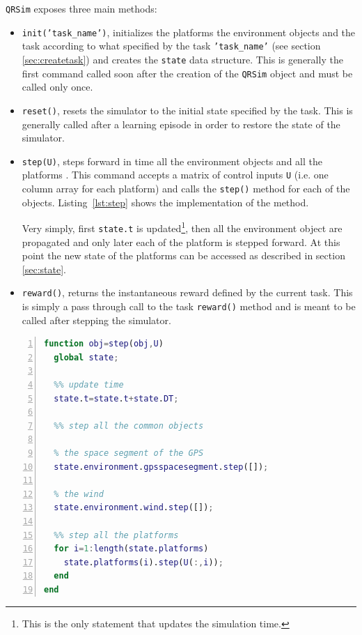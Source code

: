 \documentclass[a4paper,11pt]{report}
\newcommand{\sname}{QRSim\xspace}
\newcommand{\snamettt}{\texttt{QRSim}\xspace}
\begin{document}
\snamettt exposes three main methods:
\begin{itemize}
 \item \texttt{init('task\_name')}, initializes the platforms the environment objects and the task according to what specified by the task \texttt{'task\_name'} (see section \ref{sec:createtask}) and creates the \texttt{state} data structure. This is generally the first command called soon after the creation of the \snamettt object and must be called only once.
 \item \texttt{reset()}, resets the simulator to the initial state specified by the task. This is generally called after a learning episode in order to restore the state of the simulator. 
 \item \texttt{step(U)}, steps forward in time all the environment objects and all the platforms . This command accepts a matrix of control inputs \texttt{U} (i.e. one column array for each platform) and calls the \texttt{step()} method for each of the objects. Listing~\ref{lst:step} shows the implementation of the method.

Very simply, first \texttt{state.t} is updated\footnote{This is the only statement that updates the simulation time.}, then all the environment object are propagated and only later each of the platform is stepped forward. At this point the new state of the platforms can be accessed as described in section \ref{sec:state}.
 \item \texttt{reward()}, returns the instantaneous reward defined by the current task. This is simply a pass through call to the task \texttt{reward()} method and is meant to be called after stepping the simulator.
\end{itemize}

\begin{lstlisting}[float=ht!bp,caption=\sname step() method,language=Matlab,frame=lines,label=lst:step,numbers=left,basicstyle=\small]
function obj=step(obj,U)
  global state;
           
  %% update time
  state.t=state.t+state.DT;
                        
  %% step all the common objects
            
  % the space segment of the GPS
  state.environment.gpsspacesegment.step([]);
            
  % the wind
  state.environment.wind.step([]);
            
  %% step all the platforms            
  for i=1:length(state.platforms)
    state.platforms(i).step(U(:,i));
  end
end
\end{lstlisting}
\end{document}
